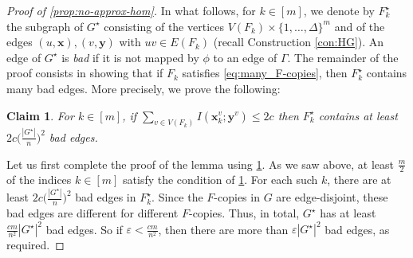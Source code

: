 \documentclass[reqno, english, 12pt]{amsart}
\theoremstyle{plain}
\newtheorem{claim}[theorem]{Claim}
\theoremstyle{remark}
\newcommand{\bx}{\mathbf{x}}
\newcommand{\by}{\mathbf{y}}
\renewcommand{\leq}{\leqslant}
\begin{document}
\begin{proof}[Proof of \cref{prop:no-approx-hom}]
    In what follows, for $k \in [m]$, we denote by $F_k^{\star}$ the subgraph of $G^{\star}$ consisting of the vertices $V(F_k) \times \{1,\dots,\Delta\}^m$ and of the edges $(u,\mathbf{x}),(v,\mathbf{y})$ with $uv \in E(F_k)$ (recall Construction \ref{con:HG}).
    An edge of $G^{\star}$ is {\em bad} if it is not mapped by $\phi$ to an edge of $\Gamma$.
	The remainder of the proof consists in showing that if $F_k$  satisfies \eqref{eq:many_F-copies}, then $F_k^{\star}$ contains many bad edges. More precisely, we prove the following:
	\begin{claim}\label{claim:bad edges}
		For $k \in [m]$, if 
		$\sum_{v\in V(F_k)}I(\bx^v_k;\by^v) \leq 2c$ then $F_k^{\star}$ contains at least $2c \big( \frac{|G^{\star}|}{n} \big)^2$ \nolinebreak bad \nolinebreak edges.
	\end{claim}

	Let us first complete the proof of the lemma using \cref{claim:bad edges}. As we saw above, at least $\frac{m}{2}$ of the indices $k \in [m]$ satisfy the condition of \cref{claim:bad edges}. For each such $k$, there are at least $2c \big( \frac{|G^{\star}|}{n} \big)^2$ bad edges in $F_k^{\star}$. 
	Since the $F$-copies in $G$ are edge-disjoint, these bad edges are different for different $F$-copies.
	Thus, in total, $G^{\star}$ has at least 
    $\frac{cm}{n^2}|G^{\star}|^2$ bad edges.
	So if $\varepsilon < \frac{cm}{n^2}$, then there are more than $\varepsilon |G^{\star}|^2$ bad edges,
	as required. 
	



\end{proof}
\end{document}
